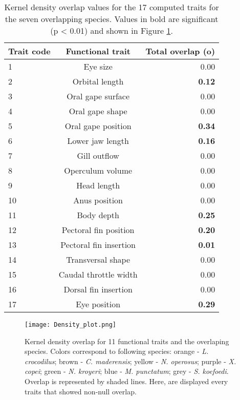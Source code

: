 \begin{table}[!htbp]
\centering
\caption[Kernel density overlap values for the 17 traits]{Kernel density overlap values for the 17 computed traits for the seven overlapping species. Values in bold are significant (p < 0.01) and shown in Figure \ref{fig:dpo}.}
\label{table:kern_over_val}
\begin{adjustbox}{max width=1.1\textwidth,center}
\begin{tabular}{lcr}
  \hline
Trait code & Functional trait & Total overlap (o) \\ 
  \hline
1 & Eye size & 0.00 \\ 
  2 & Orbital length & \textbf{0.12} \\ 
  3 & Oral gape surface & 0.00 \\ 
  4 & Oral gape shape &0.00 \\ 
  5 & Oral gape position & \textbf{0.34} \\ 
  6 & Lower jaw length & \textbf{0.16} \\ 
  7 & Gill outflow & 0.00 \\ 
  8 & Operculum volume & 0.00 \\ 
  9 & Head length & 0.00 \\ 
  10 & Anus position & 0.00 \\ 
  11 & Body depth & \textbf{0.25} \\ 
  12 & Pectoral fin position & \textbf{0.20} \\ 
  13 & Pectoral fin insertion & \textbf{0.01} \\ 
  14 & Transversal shape & 0.00 \\ 
  15 & Caudal throttle width & 0.00 \\ 
  16 & Dorsal fin insertion & 0.00 \\ 
  17 & Eye position & \textbf{0.29} \\ 
   \hline
\end{tabular}
\end{adjustbox}
\end{table} 

\begin{figure} [!htbp]
	\begin{center}
		\texttt{[image: Density\_plot.png]}
	\end{center}
	\caption[Kernel density distribution of overlapping species]{Kernel density overlap for 11 functional traits and the overlaping species. Colors correspond to following species: orange - \textit{L. crocodilus}; brown - \textit{C. maderensis}; yellow - \textit{N. operosus}; purple - \textit{X. copei}; green - \textit{N. kroyeri}; blue - \textit{M. punctatum}; grey - \textit{S. koefoedi}. Overlap is represented by shaded lines. Here, are displayed every traits that showed non-null overlap.}
	\label{fig:dpo}
\end{figure}